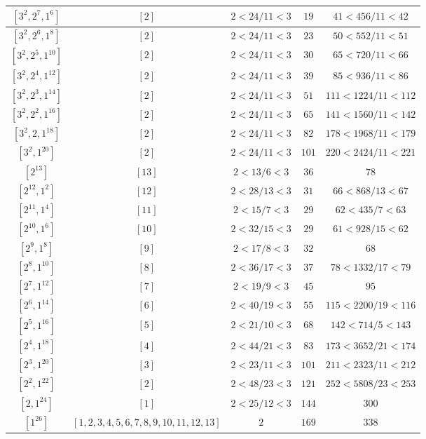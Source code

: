 \documentclass{article}%
\begin{document}
\begin{center}
\begin{longtable}{||c|c|c|c|c||}
$[3^{2}, 2^{7}, 1^{6}]$ & $[2]$ & $2 < 24/11 < 3$ & $19$ & $41 < 456/11 < 42$ \\ \hline 
$[3^{2}, 2^{6}, 1^{8}]$ & $[2]$ & $2 < 24/11 < 3$ & $23$ & $50 < 552/11 < 51$ \\ \hline 
$[3^{2}, 2^{5}, 1^{10}]$ & $[2]$ & $2 < 24/11 < 3$ & $30$ & $65 < 720/11 < 66$ \\ \hline 
$[3^{2}, 2^{4}, 1^{12}]$ & $[2]$ & $2 < 24/11 < 3$ & $39$ & $85 < 936/11 < 86$ \\ \hline 
$[3^{2}, 2^{3}, 1^{14}]$ & $[2]$ & $2 < 24/11 < 3$ & $51$ & $111 < 1224/11 < 112$ \\ \hline 
$[3^{2}, 2^{2}, 1^{16}]$ & $[2]$ & $2 < 24/11 < 3$ & $65$ & $141 < 1560/11 < 142$ \\ \hline 
$[3^{2}, 2, 1^{18}]$ & $[2]$ & $2 < 24/11 < 3$ & $82$ & $178 < 1968/11 < 179$ \\ \hline 
$[3^{2}, 1^{20}]$ & $[2]$ & $2 < 24/11 < 3$ & $101$ & $220 < 2424/11 < 221$ \\ \hline 
$[2^{13}]$ & $[13]$ & $2 < 13/6 < 3$ & $36$ & $78$ \\ \hline 
$[2^{12}, 1^{2}]$ & $[12]$ & $2 < 28/13 < 3$ & $31$ & $66 < 868/13 < 67$ \\ \hline 
$[2^{11}, 1^{4}]$ & $[11]$ & $2 < 15/7 < 3$ & $29$ & $62 < 435/7 < 63$ \\ \hline 
$[2^{10}, 1^{6}]$ & $[10]$ & $2 < 32/15 < 3$ & $29$ & $61 < 928/15 < 62$ \\ \hline 
$[2^{9}, 1^{8}]$ & $[9]$ & $2 < 17/8 < 3$ & $32$ & $68$ \\ \hline 
$[2^{8}, 1^{10}]$ & $[8]$ & $2 < 36/17 < 3$ & $37$ & $78 < 1332/17 < 79$ \\ \hline 
$[2^{7}, 1^{12}]$ & $[7]$ & $2 < 19/9 < 3$ & $45$ & $95$ \\ \hline 
$[2^{6}, 1^{14}]$ & $[6]$ & $2 < 40/19 < 3$ & $55$ & $115 < 2200/19 < 116$ \\ \hline 
$[2^{5}, 1^{16}]$ & $[5]$ & $2 < 21/10 < 3$ & $68$ & $142 < 714/5 < 143$ \\ \hline 
$[2^{4}, 1^{18}]$ & $[4]$ & $2 < 44/21 < 3$ & $83$ & $173 < 3652/21 < 174$ \\ \hline 
$[2^{3}, 1^{20}]$ & $[3]$ & $2 < 23/11 < 3$ & $101$ & $211 < 2323/11 < 212$ \\ \hline 
$[2^{2}, 1^{22}]$ & $[2]$ & $2 < 48/23 < 3$ & $121$ & $252 < 5808/23 < 253$ \\ \hline 
$[2, 1^{24}]$ & $[1]$ & $2 < 25/12 < 3$ & $144$ & $300$ \\ \hline 
$[1^{26}]$ & $[1, 2, 3, 4, 5, 6, 7, 8, 9, 10, 11, 12, 13]$ & $2$ & $169$ & $338$ \\ \hline 
    \end{longtable}
    \end{center}
\newpage
\end{document}
